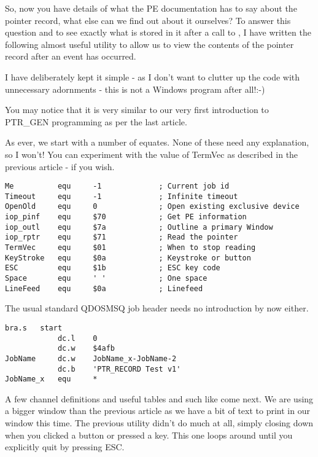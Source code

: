 So, now you have details of what the PE documentation has to say about the pointer record,
what else can we find out about it ourselves? To answer this question and to see exactly
what is stored in it after a call to , I have written the following almost useful
utility to allow us to view the contents of the pointer record after an event has
occurred.

I have deliberately kept it simple -{} as I don't want to clutter up the code with
unnecessary adornments -{} this is not a Windows program after all!:-{})

You may notice that it is very similar to our very first introduction to PTR\_GEN programming as per the last article.

As ever, we start with a number of equates. None of these need any explanation, so I
won't! You can experiment with the value of TermVec as described in the previous
article -{} if you wish.

\begin{lstlisting}[firstnumber=1,caption={Pointer Record Examiner - Equates}]
Me          equ     -1             ; Current job id
Timeout     equ     -1             ; Infinite timeout
OpenOld     equ     0              ; Open existing exclusive device
iop_pinf    equ     $70            ; Get PE information
iop_outl    equ     $7a            ; Outline a primary Window
iop_rptr    equ     $71            ; Read the pointer
TermVec     equ     $01            ; When to stop reading
KeyStroke   equ     $0a            ; Keystroke or button
ESC         equ     $1b            ; ESC key code
Space       equ     ' '            ; One space
LineFeed    equ     $0a            ; Linefeed
\end{lstlisting}

The usual standard QDOSMSQ job header needs no introduction by now either.

\begin{lstlisting}[firstnumber=last,caption={Pointer Record Examiner - Job Header}]
            bra.s   start
            dc.l    0
            dc.w    $4afb
JobName     dc.w    JobName_x-JobName-2
            dc.b    'PTR_RECORD Test v1'
JobName_x   equ     *
\end{lstlisting}

A few channel definitions and useful tables and such like come next. We are using a bigger
window than the previous article as we have a bit of text to print in our window this
time. The previous utility didn't do much at all, simply closing down when you clicked a
button or pressed a key. This one loops around until you explicitly quit by pressing
ESC.

